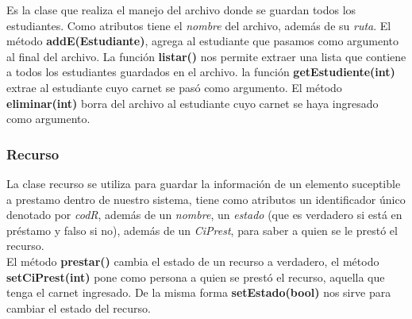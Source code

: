 \documentclass[12pt]{article}
\begin{document}
Es la clase que realiza el manejo del archivo donde se guardan todos los estudiantes.  Como atributos tiene el \textit{nombre }del archivo, además de su \textit{ruta}.  El método \textbf{addE(Estudiante)}, agrega al estudiante que pasamos como argumento al final del archivo.  La función \textbf{listar()} nos permite extraer una lista que contiene a todos los estudiantes guardados en el archivo. la función \textbf{getEstudiente(int)} extrae al estudiante cuyo carnet se pasó como argumento.  El método \textbf{eliminar(int)} borra del archivo al estudiante cuyo carnet se haya ingresado como argumento. 

\subsubsection{Recurso}
\begin{center}
\end{center}

La clase recurso se utiliza para guardar la información de un elemento suceptible a prestamo dentro de nuestro sistema, tiene como atributos un identificador único denotado por \textit{codR}, además de un \textit{nombre}, un \textit{estado} (que es verdadero si está en préstamo y falso si no), además de un \textit{CiPrest}, para saber a quien se le prestó el recurso.   \\ 
El método \textbf{prestar()} cambia el estado de un recurso a verdadero, el método \textbf{setCiPrest(int)} pone como persona a quien se prestó el recurso, aquella que tenga el carnet ingresado.  De la misma forma \textbf{setEstado(bool)} nos sirve para cambiar el estado del recurso.  
\end{document}
